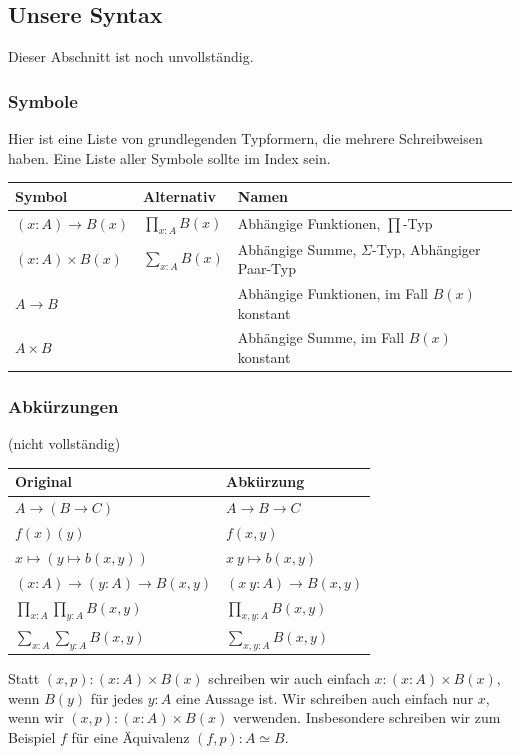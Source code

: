 \subsection{Unsere Syntax}
Dieser Abschnitt ist noch unvollständig.

\subsubsection{Symbole}
Hier ist eine Liste von grundlegenden Typformern, die mehrere Schreibweisen haben.
Eine Liste aller Symbole sollte im Index sein.
\begin{center}
  \begin{tabular}{lll}
    Symbol & Alternativ & Namen \\
    \midrule
  $(x:A)\to B(x)$ & $\prod_{x:A}B(x)$ & Abhängige Funktionen, $\prod$-Typ \\
    $(x:A)\times B(x)$ & $\sum_{x:A}B(x)$ & Abhängige Summe, $\Sigma$-Typ, Abhängiger Paar-Typ \\
    $A\to B$ & & Abhängige Funktionen, im Fall $B(x)$ konstant \\
    $A\times B$ & & Abhängige Summe, im Fall $B(x)$ konstant
  \end{tabular}
\end{center}

\subsubsection{Abkürzungen}
(nicht vollständig)
\begin{center}
  \begin{tabular}{ll}
    Original & Abkürzung \\
    \midrule
    $A\to (B\to C)$ & $A\to B\to C$ \\
    $f(x)(y)$ & $f(x,y)$ \\
    $x\mapsto (y\mapsto b(x,y))$ & $x\ y \mapsto b(x,y)$ \\
    $(x:A) \to (y : A) \to B(x,y)$ & $(x\ y : A)\to B(x,y)$ \\
    $\prod_{x:A}\prod_{y:A}B(x,y)$ & $\prod_{x,y:A}B(x,y)$ \\
    $\sum_{x:A}\sum_{y:A}B(x,y)$ & $\sum_{x,y:A}B(x,y)$
  \end{tabular}
\end{center}
Statt $(x,p):(x:A)\times B(x)$ schreiben wir auch einfach $x:(x:A)\times B(x)$,
wenn $B(y)$ für jedes $y:A$ eine Aussage ist. Wir schreiben auch einfach nur $x$, wenn wir $(x,p):(x:A)\times B(x)$ verwenden.
Insbesondere schreiben wir zum Beispiel $f$ für eine Äquivalenz $(f,p):A\simeq B$.


